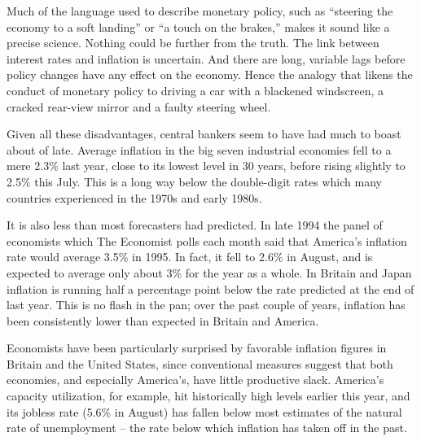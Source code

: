 \documentclass[a4paper]{article}
\begin{document}
\par
Much of the language used to describe monetary policy, such as “steering the economy to a soft landing” or “a touch on the brakes,” makes it sound like a precise science. Nothing could be further from the truth. The link between interest rates and inflation is uncertain. And there are long, variable lags before policy changes have any effect on the economy. Hence the analogy that likens the conduct of monetary policy to driving a car with a blackened windscreen, a cracked rear-view mirror and a faulty steering wheel.

\par
Given all these disadvantages, central bankers seem to have had much to boast about of late. Average inflation in the big seven industrial economies fell to a mere 2.3\% last year, close to its lowest level in 30 years, before rising slightly to 2.5\% this July. This is a long way below the double-digit rates which many countries experienced in the 1970s and early 1980s.

\par
It is also less than most forecasters had predicted. In late 1994 the panel of economists which The Economist polls each month said that America’s inflation rate would average 3.5\% in 1995. In fact, it fell to 2.6\% in August, and is expected to average only about 3\% for the year as a whole. In Britain and Japan inflation is running half a percentage point below the rate predicted at the end of last year. This is no flash in the pan; over the past couple of years, inflation has been consistently lower than expected in Britain and America.

\par
Economists have been particularly surprised by favorable inflation figures in Britain and the United States, since conventional measures suggest that both economies, and especially America’s, have little productive slack. America’s capacity utilization, for example, hit historically high levels earlier this year, and its jobless rate (5.6\% in August) has fallen below most estimates of the natural rate of unemployment -- the rate below which inflation has taken off in the past.
\end{document}
